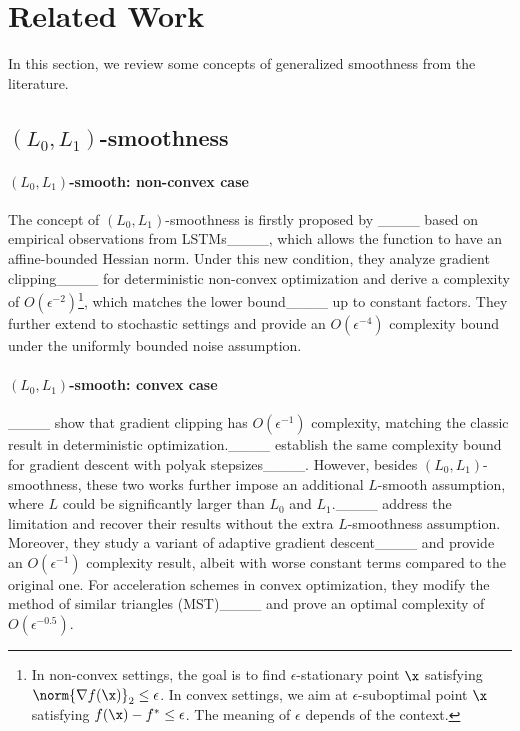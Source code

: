 \section{Related Work\label{sec:related-work}
}

In this section, we review some concepts of generalized smoothness from the literature.

\subsection{$(L_0,L_1)$-smoothness}

\paragraph{$(L_0,L_1)$-smooth: non-convex case} 
The concept of $(L_0,L_1)$-smoothness is firstly proposed by ____ based on empirical observations from LSTMs____, which allows the function to have an affine-bounded Hessian norm. Under this new condition, they analyze gradient clipping____ for deterministic non-convex optimization and derive a complexity of $O(\epsilon^{-2})$\footnote{In non-convex settings, the goal is to find $\epsilon$-stationary point $\x$ satisfying $\norm{\nabla f(\x)}_2\le\epsilon$. In convex settings, we aim at $\epsilon$-suboptimal point $\x$ satisfying $f(\x)-f^*\le\epsilon$. The meaning of $\epsilon$ depends of the context.}, which matches the lower bound____ up to constant factors. They further extend to stochastic settings and provide an $O(\epsilon^{-4})$ complexity bound under the uniformly bounded noise assumption.

\paragraph{$(L_0,L_1)$-smooth: convex case}
____ show that gradient clipping has $O(\epsilon^{-1})$ complexity, matching the classic result in deterministic optimization.____ establish the same complexity bound for gradient descent with polyak stepsizes____. However, besides $(L_0,L_1)$-smoothness, these two works further impose an additional $L$-smooth assumption, where $L$ could be significantly larger than $L_0$ and $L_1$.____ address the limitation and recover their results without the extra $L$-smoothness assumption. Moreover, they study a variant of adaptive gradient descent____ and provide an $O(\epsilon^{-1})$ complexity result, albeit with worse constant terms compared to the original one. For acceleration schemes in convex optimization, they modify the method of similar triangles (MST)____ and prove an optimal complexity of $O(\epsilon^{-0.5})$.

